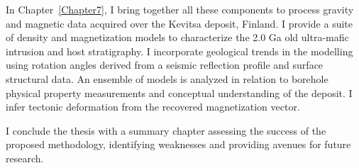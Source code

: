 In Chapter~\ref{Chapter7}, I bring together all these components to process gravity and magnetic data acquired over the Kevitsa deposit, Finland. I provide a suite of density and magnetization models to characterize the 2.0 Ga old ultra-mafic intrusion and host stratigraphy. I incorporate geological trends in the modelling using rotation angles derived from a seismic reflection profile and surface structural data. An ensemble of models is analyzed in relation to borehole physical property measurements and conceptual understanding of the deposit. I infer tectonic deformation from the recovered magnetization vector.

I conclude the thesis with a summary chapter assessing the success of the proposed methodology, identifying weaknesses and providing avenues for future research.



\endinput



